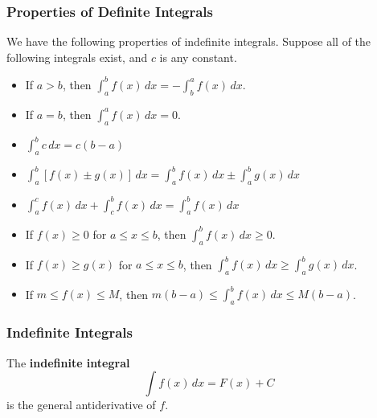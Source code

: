 \subsubsection{Properties of Definite Integrals}
We have the following properties of indefinite integrals.
Suppose all of the following integrals exist, and \(c\) is any constant.
\begin{itemize}
    \item If \(a>b\), then
    \(\displaystyle{\int_a^b f(x)\,dx=-\int_b^a f(x)\,dx}\).
    \item If \(a=b\), then
    \(\displaystyle{\int_a^a f(x)\,dx=0}\).
    \item \(\displaystyle{\int_a^b c\,dx=c(b-a)}\)
    \item \(\displaystyle{\int_a^b[f(x)\pm g(x)]\,dx
    =\int_a^b f(x)\,dx\pm \int_a^b g(x)\,dx}\)
    \item \(\displaystyle{\int_a^c f(x)\,dx+\int_c^b f(x)\,dx
    =\int_a^b f(x)\,dx}\)
    \item If \(f(x)\geq 0\) for \(a\leq x\leq b\),
    then \(\displaystyle{\int_a^b f(x)\,dx\geq 0}\).
    \item If \(f(x)\geq g(x)\) for \(a\leq x\leq b\),
    then \(\displaystyle{\int_a^b f(x)\,dx\geq \int_a^b g(x)\,dx}\).
    \item If \(m\leq f(x)\leq M\),
    then \(\displaystyle{m(b-a)\leq\int_a^b f(x)\,dx\leq M(b-a)}\).
\end{itemize}

\subsubsection{Indefinite Integrals}
\begin{definition}
    The \textbf{indefinite integral} \[\int f(x)\,dx=F(x)+C\]
    is the general antiderivative of \(f\).
\end{definition}